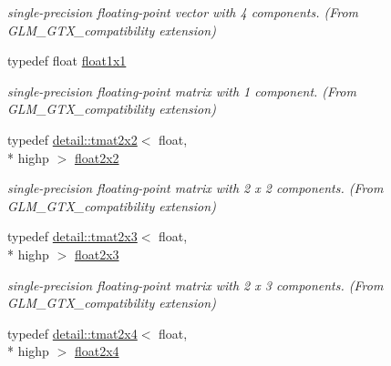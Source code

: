 \begin{DoxyCompactItemize}
\begin{DoxyCompactList}\small\item\em single-\/precision floating-\/point vector with 4 components. (From G\-L\-M\-\_\-\-G\-T\-X\-\_\-compatibility extension) \end{DoxyCompactList}\item 
\hypertarget{group__gtx__compatibility_gaac1faa940ac1fbb32d4a315005b578af}{typedef float \hyperlink{group__gtx__compatibility_gaac1faa940ac1fbb32d4a315005b578af}{float1x1}}\label{group__gtx__compatibility_gaac1faa940ac1fbb32d4a315005b578af}

\begin{DoxyCompactList}\small\item\em single-\/precision floating-\/point matrix with 1 component. (From G\-L\-M\-\_\-\-G\-T\-X\-\_\-compatibility extension) \end{DoxyCompactList}\item 
\hypertarget{group__gtx__compatibility_gaa4a1e4449913b2437f12434ed713dd73}{typedef \hyperlink{structglm_1_1detail_1_1tmat2x2}{detail\-::tmat2x2}$<$ float, \\*
highp $>$ \hyperlink{group__gtx__compatibility_gaa4a1e4449913b2437f12434ed713dd73}{float2x2}}\label{group__gtx__compatibility_gaa4a1e4449913b2437f12434ed713dd73}

\begin{DoxyCompactList}\small\item\em single-\/precision floating-\/point matrix with 2 x 2 components. (From G\-L\-M\-\_\-\-G\-T\-X\-\_\-compatibility extension) \end{DoxyCompactList}\item 
\hypertarget{group__gtx__compatibility_gaf6c91675c075853da392b1d2dfc45f65}{typedef \hyperlink{structglm_1_1detail_1_1tmat2x3}{detail\-::tmat2x3}$<$ float, \\*
highp $>$ \hyperlink{group__gtx__compatibility_gaf6c91675c075853da392b1d2dfc45f65}{float2x3}}\label{group__gtx__compatibility_gaf6c91675c075853da392b1d2dfc45f65}

\begin{DoxyCompactList}\small\item\em single-\/precision floating-\/point matrix with 2 x 3 components. (From G\-L\-M\-\_\-\-G\-T\-X\-\_\-compatibility extension) \end{DoxyCompactList}\item 
\hypertarget{group__gtx__compatibility_gaaff795523eb814705d3f1cc7fd3421f2}{typedef \hyperlink{structglm_1_1detail_1_1tmat2x4}{detail\-::tmat2x4}$<$ float, \\*
highp $>$ \hyperlink{group__gtx__compatibility_gaaff795523eb814705d3f1cc7fd3421f2}{float2x4}}\label{group__gtx__compatibility_gaaff795523eb814705d3f1cc7fd3421f2}


\end{DoxyCompactItemize}
